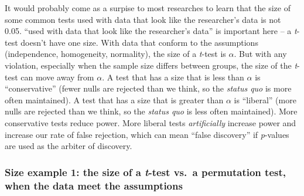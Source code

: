 \documentclass[]{book}
\begin{document}
It would probably come as a surpise to most researches to learn that the size of some common tests used with data that look like the researcher's data is not 0.05. ``used with data that look like the researcher's data'' is important here -- a \emph{t}-test doesn't have one size. With data that conform to the assumptions (independence, homogeneity, normality), the size of a \emph{t}-test is \(\alpha\). But with any violation, especially when the sample size differs between groups, the size of the \emph{t}-test can move away from \(\alpha\). A test that has a size that is less than \(\alpha\) is ``conservative'' (fewer nulls are rejected than we think, so the \emph{status quo} is more often maintained). A test that has a size that is greater than \(\alpha\) is ``liberal'' (more nulls are rejected than we think, so the \emph{status quo} is less often maintained). More conservative tests reduce power. More liberal tests \emph{artificially} increase power and increase our rate of false rejection, which can mean ``false discovery'' if \emph{p}-values are used as the arbiter of discovery.

\hypertarget{size-example-1-the-size-of-a-t-test-vs.-a-permutation-test-when-the-data-meet-the-assumptions}{%
\subsubsection{\texorpdfstring{Size example 1: the size of a \emph{t}-test vs.~a permutation test, when the data meet the assumptions}{Size example 1: the size of a t-test vs.~a permutation test, when the data meet the assumptions}}\label{size-example-1-the-size-of-a-t-test-vs.-a-permutation-test-when-the-data-meet-the-assumptions}}
\end{document}
